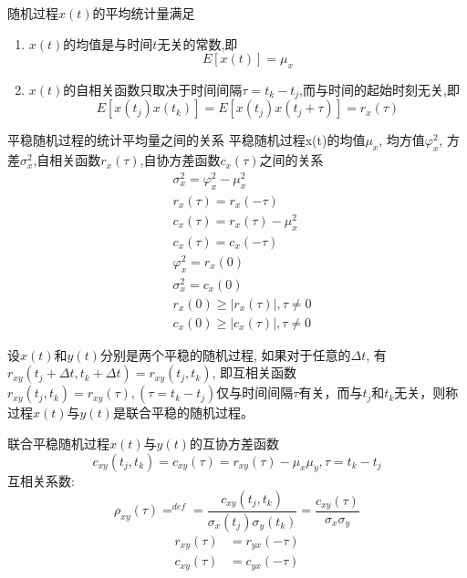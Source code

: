 \begin{frame}
\begin{definition}
	随机过程$x(t)$的平均统计量满足
	\begin{enumerate}
		\item $x(t)$的均值是与时间$t$无关的常数,即
		\[E[x(t)]=\mu_x\]
		\item $x(t)$的自相关函数只取决于时间间隔$\tau=t_k-t_j$,而与时间的起始时刻无关,即
		\[E[x(t_j)x(t_k)]=E[x(t_j)x(t_j+\tau)]=r_x(\tau) \]
	\end{enumerate}
\end{definition}
\end{frame}

\begin{frame}{平稳随机过程的统计平均量之间的关系}
平稳随机过程x(t)的均值$\mu_x$, 均方值$\varphi_x^2$, 方差$\sigma_x^2$,自相关函数$r_x(\tau)$,自协方差函数$c_x(\tau)$之间的关系
\begin{align*}
&\sigma_x^2=\varphi_x^2-\mu_x^2\\
&r_x(\tau)=r_x(-\tau)\\
&c_x(\tau)=r_x(\tau)-\mu_x^2\\
&c_x(\tau)=c_x(-\tau)\\
&\varphi_x^2=r_x(0)\\
&\sigma_x^2=c_x(0)\\
&r_x(0)\ge|r_x(\tau)|, \tau\ne 0\\
&c_x(0)\ge|c_x(\tau)|, \tau\ne 0
\end{align*}
\end{frame}

\begin{frame}
\begin{definition}[联合平稳随机过程]
	设$x(t)$和$y(t)$分别是两个平稳的随机过程, 如果对于任意的$\Delta t$, 有$r_{xy}(t_j+\Delta t,t_k+\Delta t)=r_{xy}(t_j,t_k)$, 即互相关函数$r_{xy}(t_j,t_k)=r_{xy}(\tau),(\tau=t_k-t_j)$仅与时间间隔$\tau$有关，而与$t_j$和$t_k$无关，则称过程$x(t)$与$y(t)$是联合平稳的随机过程。
\end{definition}
\begin{block}{联合平稳随机过程$x(t)$与$y(t)$的互协方差函数}
	\[c_{xy}(t_j,t_k)=c_{xy}(\tau)=r_{xy}(\tau)-\mu_x\mu_y, \tau=t_k-t_j\]
	互相关系数:
	\[\rho_{xy}(\tau)\mathop{=}^{def}=\frac{c_{xy}(t_j,t_k)}{\sigma_x(t_j)\sigma_y(t_k)}=\frac{c_{xy}(\tau)}{\sigma_x\sigma_y}\]
	\begin{align*}
	r_{xy}(\tau)&=r_{yx}(-\tau)\\
	c_{xy}(\tau)&=c_{yx}(-\tau)
	\end{align*}
\end{block}
\end{frame}

